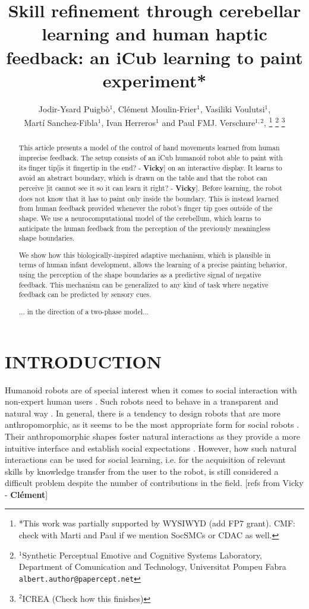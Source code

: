 \documentclass[letterpaper, 10 pt, conference]{ieeeconf}  %
\title{\LARGE \bf
Skill refinement through cerebellar learning and human haptic feedback:
an iCub learning to paint experiment*
}
\author{Jodir-Ysard Puigb\`o$^{1}$, Cl\'{e}ment Moulin-Frier$^{1}$, Vasiliki Voulutsi$^{1}$,\\ Mart\'i Sanchez-Fibla$^{1}$, Ivan Herreros$^{1}$ and Paul FMJ. Verschure$^{1,2}$, %
\thanks{*This work was partially supported by WYSIWYD (add FP7 grant). CMF: check with Marti and Paul if we mention SocSMCs or CDAC as well. }%
\thanks{$^{1}$Synthetic Perceptual Emotive and Cognitive Systems Laboratory, Department of Comunication and Technology, Universitat Pompeu Fabra
        {\tt\small albert.author@papercept.net}}%
\thanks{$^{2}$ICREA (Check how this finishes)
        }%
}
\newcommand\cmf[1]{{\footnotesize \color{red}[#1 - \textbf{Cl\'ement}]}} %
\newcommand\vv[1]{{\color{red}}{\color{red}}{\footnotesize \color{red}[#1 - \textbf{Vicky}]}} %
\begin{document}
\maketitle
\thispagestyle{empty}
\pagestyle{empty}


\begin{abstract}
This article presents a model of the control of hand movements learned from human imprecise feedback. 
The setup consists of an iCub humanoid robot able to paint with its finger tip\vv{is it fingertip in the end?} on an interactive display. It learns to avoid an abstract boundary, which is drawn on the table and that the robot can perceive \vv{it cannot see it so it can learn it right?}. Before learning, the robot does not know that it has to paint only inside the boundary. This is instead learned from human feedback provided whenever the robot’s finger tip goes outside of the shape. We use a neurocomputational model of the cerebellum, which learns to anticipate the human feedback from the perception of the previously meaningless shape boundaries. 

We show how this biologically-inspired adaptive mechanism, which is plausible in terms of human infant development, allows the learning of a precise painting behavior, using the perception of the shape boundaries as a predictive signal of negative feedback. This mechanism can be generalized to any kind of task where negative feedback can be predicted by sensory cues.

... in the direction of a two-phase model...


\end{abstract}



\section{INTRODUCTION}

Humanoid robots are of special interest when it comes to social interaction with non-expert human users \cite{goodrich2007human}. Such robots need to behave in a transparent and natural way \cite{breazeal2009role}. In general, there is a tendency to design robots that are more anthropomorphic, as it seems to be the most appropriate form for social robots \cite{disalvo2002all}. Their anthropomorphic shapes foster natural interactions as they provide a more intuitive interface and establish social expectations \cite{duffy2003anthropomorphism}. However, how such natural interactions can be used for social learning, i.e. for the acquisition of relevant skills by knowledge transfer from the user to the robot, is still considered a difficult problem despite the number of contributions in the field. \cmf{refs from Vicky}
\end{document}
